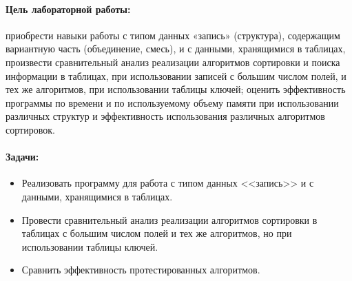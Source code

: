 \Introduction

\paragraph{Цель лабораторной работы: } приобрести  навыки  работы  с  типом  данных  «запись» 
(структура), содержащим вариантную часть  (объединение, смесь), и с данными, 
хранящимися  в  таблицах,  произвести  сравнительный  анализ  реализации 
алгоритмов  сортировки и поиска информации в таблицах,  при использовании 
записей  с  большим  числом  полей, и  тех  же  алгоритмов,  при  использовании 
таблицы  ключей; оценить  эффективность программы  по  времени  и  по 
используемому  объему  памяти при  использовании  различных  структур  и 
эффективность использования различных алгоритмов сортировок. 

\paragraph{Задачи: }

\begin{itemize}
	\item Реализовать программу для работа с типом данных <<запись>> и с данными, хранящимися в таблицах.
	\item Провести сравнительный анализ реализации алгоритмов сортировки в таблицах с большим числом полей и тех же алгоритмов, но при использовании таблицы ключей.
	\item Сравнить эффективность протестированных алгоритмов.
\end{itemize}